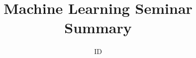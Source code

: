 \documentclass[11pt,letterpaper]{article}
\begin{document}
\title{\Title{} Machine Learning Seminar \\ Summary \HomeworkNumber{}}%
\author{ID \IDCode{}}%
\date{\DueBy{}}%
\maketitle


\end{document}
